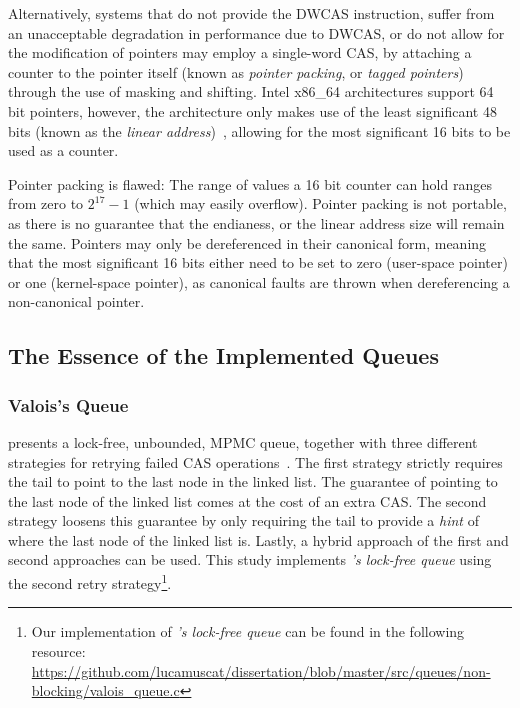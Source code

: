 Alternatively, systems that do not provide the DWCAS instruction, suffer from
an unacceptable degradation in performance due to DWCAS, or do not allow for
the modification of pointers may employ a single-word CAS, by attaching a
counter to the pointer itself (known as \emph{pointer packing}, or \emph{tagged
pointers}) through the use of masking and shifting. Intel x86\_64 architectures support 64 bit pointers, however, the
architecture only makes use of the least significant 48 bits (known as the
\emph{linear address})~\citep[Section~3.3.7.1]{intel2021system}, allowing for
the most significant 16 bits to be used as a counter.

Pointer packing is flawed: 
The range of values a 16 bit counter can hold ranges from zero to $2^{17}-1$
(which may easily overflow).
Pointer packing is not portable, as there is no guarantee that the endianess,
or the linear address size will remain the same. 
Pointers may only be dereferenced in their canonical form, meaning that the
most significant 16 bits either need to be set to zero (user-space pointer) or
one (kernel-space pointer), as canonical faults are thrown when
dereferencing a non-canonical pointer.
\pagebreak
\subsection{The Essence of the Implemented Queues}
\subsubsection{Valois's Queue}
\citeauthor{valois1994queues} presents a lock-free, unbounded, MPMC queue,
together with three different strategies for retrying failed CAS operations~\citep{valois1994queues}.
The first strategy strictly requires the tail to point to the last node in the
linked list. The guarantee of pointing to the last node of the linked list
comes at the cost of an extra CAS. The second strategy loosens
this guarantee by only requiring the tail to provide a \emph{hint} of where the
last node of the linked list is. Lastly, a hybrid approach of the first and
second approaches can be used. This study implements 
\emph{\citeauthor{valois1994queues}'s lock-free queue} using the second retry
strategy\footnote{Our implementation of \emph{\citeauthor{valois1994queues}'s lock-free queue} can be found in the following
resource: \url{https://github.com/lucamuscat/dissertation/blob/master/src/queues/non-blocking/valois_queue.c}}.

